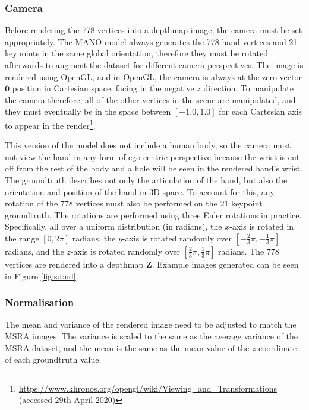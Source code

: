 \subsubsection{Camera}
Before rendering the 778 vertices into a depthmap image, the camera must be set appropriately. The MANO model always generates the 778 hand vertices and 21 keypoints in the same global orientation, therefore they must be rotated afterwards to augment the dataset for different camera perspectives. The image is rendered using OpenGL, and in OpenGL, the camera is always at the zero vector $\bm{0}$ position in Cartesian space, facing in the negative $z$ direction. To manipulate the camera therefore, all of the other vertices in the scene are manipulated, and they must eventually be in the space between $[-1.0, 1.0]$ for each Cartesian axis to appear in the render\footnote{\url{https://www.khronos.org/opengl/wiki/Viewing_and_Transformations} (accessed 29th April 2020)}.

This version of the model does not include a human body, so the camera must not view the hand in any form of ego-centric perspective because the wrist is cut off from the rest of the body and a hole will be seen in the rendered hand's wrist. The groundtruth describes not only the articulation of the hand, but also the orientation and position of the hand in 3D space. To account for this, any rotation of the 778 vertices must also be performed on the 21 keypoint groundtruth. The rotations are performed using three Euler rotations in practice. Specifically, all over a uniform distribution (in radians), the $x$-axis is rotated in the range $[0, 2\pi]$ radians, the $y$-axis is rotated randomly over $[-\frac{2}{3}\pi, -\frac{1}{3}\pi]$ radians, and the $z$-axis is rotated randomly over $[\frac{2}{3}\pi, \frac{1}{3}\pi]$ radians. The 778 vertices are rendered into a depthmap $\bm{Z}$. Example images generated can be seen in Figure \ref{fig:sd:nd}.

\subsubsection{Normalisation}
\label{sec:sd:nd:norm}
The mean and variance of the rendered image need to be adjusted to match the MSRA images. The variance is scaled to the same as the average variance of the MSRA dataset, and the mean is the same as the mean value of the $z$ coordinate of each groundtruth value.

